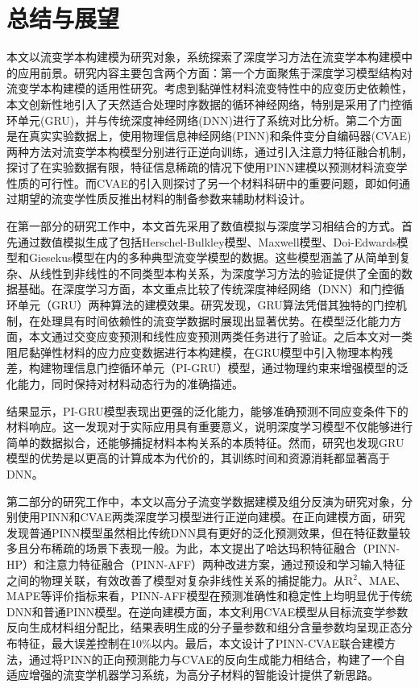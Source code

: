 \chapter{总结与展望}
本文以流变学本构建模为研究对象，系统探索了深度学习方法在流变学本构建模中的应用前景。研究内容主要包含两个方面：第一个方面聚焦于深度学习模型结构对流变学本构建模的适用性研究。考虑到黏弹性材料流变特性中的应变历史依赖性，本文创新性地引入了天然适合处理时序数据的循环神经网络，特别是采用了门控循环单元(GRU)，并与传统深度神经网络(DNN)进行了系统对比分析。第二个方面是在真实实验数据上，使用物理信息神经网络(PINN)和条件变分自编码器(CVAE)两种方法对流变学本构模型分别进行正逆向训练，通过引入注意力特征融合机制，探讨了在实验数据有限，特征信息稀疏的情况下使用PINN建模以预测材料流变学性质的可行性。而CVAE的引入则探讨了另一个材料科研中的重要问题，即如何通过期望的流变学性质反推出材料的制备参数来辅助材料设计。

在第一部分的研究工作中，本文首先采用了数值模拟与深度学习相结合的方式。首先通过数值模拟生成了包括Herschel-Bulkley模型、Maxwell模型、Doi-Edwards模型和Giesekus模型在内的多种典型流变学模型的数据。这些模型涵盖了从简单到复杂、从线性到非线性的不同类型本构关系，为深度学习方法的验证提供了全面的数据基础。在深度学习方面，本文重点比较了传统深度神经网络（DNN）和门控循环单元（GRU）两种算法的建模效果。研究发现，GRU算法凭借其独特的门控机制，在处理具有时间依赖性的流变学数据时展现出显著优势。在模型泛化能力方面，本文通过交变应变预测和线性应变预测两类任务进行了验证。之后本文对一类阻尼黏弹性材料的应力应变数据进行本构建模，在GRU模型中引入物理本构残差，构建物理信息门控循环单元（PI-GRU）模型，通过物理约束来增强模型的泛化能力，同时保持对材料动态行为的准确描述。

结果显示，PI-GRU模型表现出更强的泛化能力，能够准确预测不同应变条件下的材料响应。这一发现对于实际应用具有重要意义，说明深度学习模型不仅能够进行简单的数据拟合，还能够捕捉材料本构关系的本质特征。然而，研究也发现GRU模型的优势是以更高的计算成本为代价的，其训练时间和资源消耗都显著高于DNN。

第二部分的研究工作中，本文以高分子流变学数据建模及组分反演为研究对象，分别使用PINN和CVAE两类深度学习模型进行正逆向建模。在正向建模方面，研究发现普通PINN模型虽然相比传统DNN具有更好的泛化预测效果，但在特征数量较多且分布稀疏的场景下表现一般。为此，本文提出了哈达玛积特征融合（PINN-HP）和注意力特征融合（PINN-AFF）两种改进方案，通过预设和学习输入特征之间的物理关联，有效改善了模型对复杂非线性关系的捕捉能力。从R$^2$、MAE、MAPE等评价指标来看，PINN-AFF模型在预测准确性和稳定性上均明显优于传统DNN和普通PINN模型。在逆向建模方面，本文利用CVAE模型从目标流变学参数反向生成材料组分配比，结果表明生成的分子量参数和组分含量参数均呈现正态分布特征，最大误差控制在10\%以内。最后，本文设计了PINN-CVAE联合建模方法，通过将PINN的正向预测能力与CVAE的反向生成能力相结合，构建了一个自适应增强的流变学机器学习系统，为高分子材料的智能设计提供了新思路。


